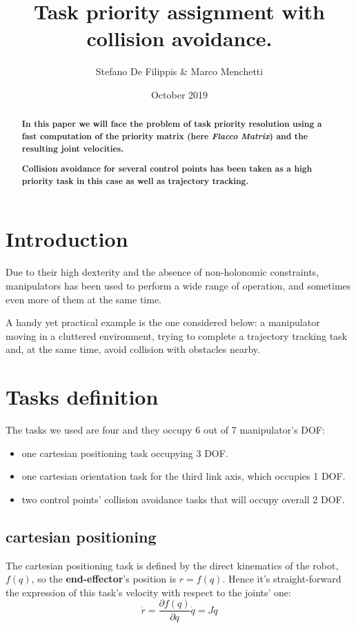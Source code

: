 \documentclass[11pt,a4paper, twocolumn, twoside]{article}
\newcommand{\diff}[2]{\frac{\partial{#1}}{\partial{#2}}}
\begin{document}
	
	\title{Task priority assignment with collision avoidance.}
	\author{Stefano De Filippis \& Marco Menchetti}
	\date{October 2019}
	\maketitle
	
\begin{abstract}
	\textbf{
	In this paper we will face the problem of task priority resolution using a fast computation of the priority matrix (here \textit{Flacco Matrix}) and the resulting joint velocities.}

\textbf{
	Collision avoidance for several control points has been taken as a high priority task in this case as well as trajectory tracking.}
\end{abstract}
\section*{Introduction}
Due to their high dexterity and the absence of non-holonomic constraints, manipulators has been used to perform a wide range of operation, and sometimes even more of them at the same time.

A handy yet practical example is the one considered below: a manipulator moving in a cluttered environment, trying to complete a trajectory tracking task and, at the same time, avoid collision with obstacles nearby.

\section{Tasks definition}
The tasks we used are four and they occupy 6 out of 7 manipulator's DOF:
\begin{itemize}
	\item one cartesian positioning task occupying 3 DOF.
	\item one cartesian orientation task for the third link axis, which occupies 1 DOF.
	\item two control points' collision avoidance tasks that will occupy overall 2 DOF.
\end{itemize}
\subsection[Task 1]{cartesian positioning}
The cartesian positioning task is defined by the direct kinematics of the robot, $f(q)$, so the \textbf{end-effector}'s position is $r = f(q)$. Hence it's straight-forward the expression of this task's velocity with respect to the joints' one: 
\begin{equation}
\label{EQN: task1}
 \dot{r} = \diff{f(q)}{q} \dot{q} = J\dot{q}
\end{equation}
\end{document}
